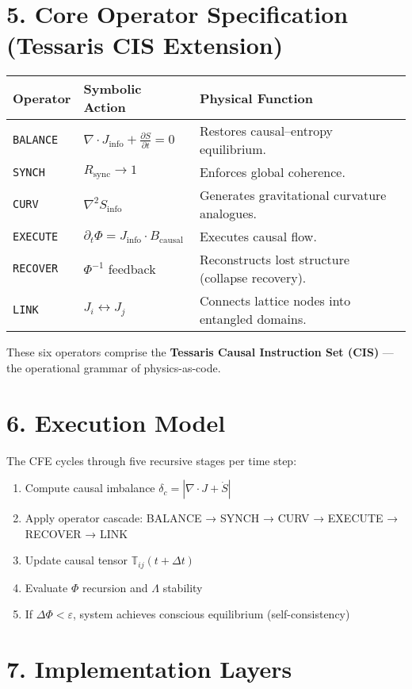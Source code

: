 \documentclass[11pt,a4paper]{article}
\begin{document}
\section{5. Core Operator Specification (Tessaris CIS Extension)}
\begin{longtable}{|l|l|l|}
\hline
\textbf{Operator} & \textbf{Symbolic Action} & \textbf{Physical Function} \\
\hline
\texttt{BALANCE} & $\nabla \cdot J_{\mathrm{info}} + \frac{\partial S}{\partial t} = 0$ & Restores causal–entropy equilibrium. \\
\texttt{SYNCH} & $R_{\mathrm{sync}} \to 1$ & Enforces global coherence. \\
\texttt{CURV} & $\nabla^2 S_{\mathrm{info}}$ & Generates gravitational curvature analogues. \\
\texttt{EXECUTE} & $\partial_t \Phi = J_{\mathrm{info}} \cdot B_{\mathrm{causal}}$ & Executes causal flow. \\
\texttt{RECOVER} & $\Phi^{-1}$ feedback & Reconstructs lost structure (collapse recovery). \\
\texttt{LINK} & $J_i \leftrightarrow J_j$ & Connects lattice nodes into entangled domains. \\
\hline
\end{longtable}

These six operators comprise the \textbf{Tessaris Causal Instruction Set (CIS)} --- the operational grammar of physics-as-code.

\section{6. Execution Model}
The CFE cycles through five recursive stages per time step:
\begin{enumerate}
  \item Compute causal imbalance $\delta_c = |\nabla \cdot J + \dot{S}|$
  \item Apply operator cascade: BALANCE → SYNCH → CURV → EXECUTE → RECOVER → LINK
  \item Update causal tensor $\mathbb{T}_{ij}(t+\Delta t)$
  \item Evaluate $\Phi$ recursion and $\Lambda$ stability
  \item If $\Delta \Phi < \varepsilon$, system achieves conscious equilibrium (self-consistency)
\end{enumerate}

\section{7. Implementation Layers}
\end{document}
